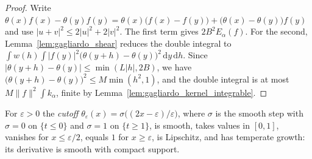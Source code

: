 \begin{proof}
\leanok
Write $\theta(x) f(x) - \theta(y) f(y) = \theta(x)\bigl(f(x) - f(y)\bigr) + \bigl(\theta(x) - \theta(y)\bigr) f(y)$ and use $\lvert u + v \rvert^2 \le 2 \lvert u \rvert^2 + 2 \lvert v \rvert^2$. The first term gives $2 B^2 E_\alpha(f)$. For the second, Lemma~\ref{lem:gagliardo_shear} reduces the double integral to $\int w(h) \int \lvert f(y) \rvert^2 \bigl(\theta(y + h) - \theta(y)\bigr)^2 \, \mathrm{d}y\, \mathrm{d}h$. Since $\lvert \theta(y + h) - \theta(y) \rvert \le \min(L \lvert h \rvert, 2B)$, we have $\bigl(\theta(y + h) - \theta(y)\bigr)^2 \le M \min(h^2, 1)$, and the double integral is at most $M \lVert f \rVert^2 \int k_\alpha$, finite by Lemma~\ref{lem:gagliardo_kernel_integrable}.
\end{proof}

\begin{definition}\label{def:cutoff_step}
\leanok
For $\varepsilon > 0$ the \emph{cutoff} $\theta_\varepsilon(x) = \sigma\bigl((2x - \varepsilon)/\varepsilon\bigr)$, where $\sigma$ is the smooth step with $\sigma = 0$ on $\{t \le 0\}$ and $\sigma = 1$ on $\{t \ge 1\}$, is smooth, takes values in $[0, 1]$, vanishes for $x \le \varepsilon/2$, equals $1$ for $x \ge \varepsilon$, is Lipschitz, and has temperate growth: its derivative is smooth with compact support.
\end{definition}
